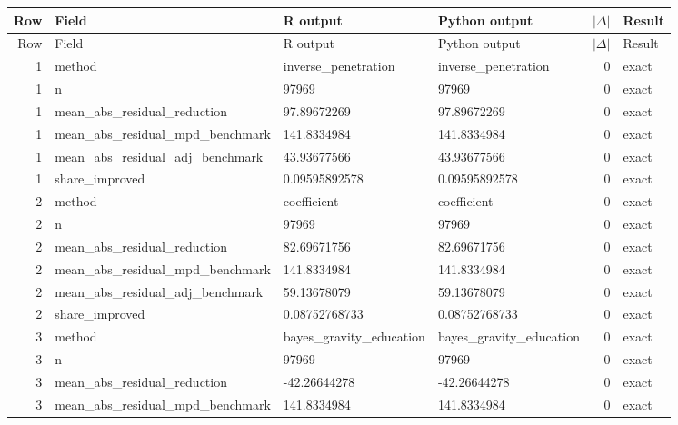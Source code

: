\documentclass[10pt]{article}
\begin{document}
\small
\begin{longtable}{@{}r p{}p{}p{}rl@{}}
\toprule
Row & Field & R output & Python output & $|\Delta|$ & Result \\
\midrule
\endfirsthead
\toprule
Row & Field & R output & Python output & $|\Delta|$ & Result \\
\midrule
\endhead
1 & method & inverse\_\allowbreak{}penetration & inverse\_\allowbreak{}penetration & 0 & exact \\
1 & n & 97969 & 97969 & 0 & exact \\
1 & mean\_\allowbreak{}abs\_\allowbreak{}residual\_\allowbreak{}reduction & 97.89672269 & 97.89672269 & 0 & exact \\
1 & mean\_\allowbreak{}abs\_\allowbreak{}residual\_\allowbreak{}mpd\_\allowbreak{}benchmark & 141.8334984 & 141.8334984 & 0 & exact \\
1 & mean\_\allowbreak{}abs\_\allowbreak{}residual\_\allowbreak{}adj\_\allowbreak{}benchmark & 43.93677566 & 43.93677566 & 0 & exact \\
1 & share\_\allowbreak{}improved & 0.09595892578 & 0.09595892578 & 0 & exact \\
2 & method & coefficient & coefficient & 0 & exact \\
2 & n & 97969 & 97969 & 0 & exact \\
2 & mean\_\allowbreak{}abs\_\allowbreak{}residual\_\allowbreak{}reduction & 82.69671756 & 82.69671756 & 0 & exact \\
2 & mean\_\allowbreak{}abs\_\allowbreak{}residual\_\allowbreak{}mpd\_\allowbreak{}benchmark & 141.8334984 & 141.8334984 & 0 & exact \\
2 & mean\_\allowbreak{}abs\_\allowbreak{}residual\_\allowbreak{}adj\_\allowbreak{}benchmark & 59.13678079 & 59.13678079 & 0 & exact \\
2 & share\_\allowbreak{}improved & 0.08752768733 & 0.08752768733 & 0 & exact \\
3 & method & bayes\_\allowbreak{}gravity\_\allowbreak{}education & bayes\_\allowbreak{}gravity\_\allowbreak{}education & 0 & exact \\
3 & n & 97969 & 97969 & 0 & exact \\
3 & mean\_\allowbreak{}abs\_\allowbreak{}residual\_\allowbreak{}reduction & -42.26644278 & -42.26644278 & 0 & exact \\
3 & mean\_\allowbreak{}abs\_\allowbreak{}residual\_\allowbreak{}mpd\_\allowbreak{}benchmark & 141.8334984 & 141.8334984 & 0 & exact \\

\end{longtable}
\end{document}
